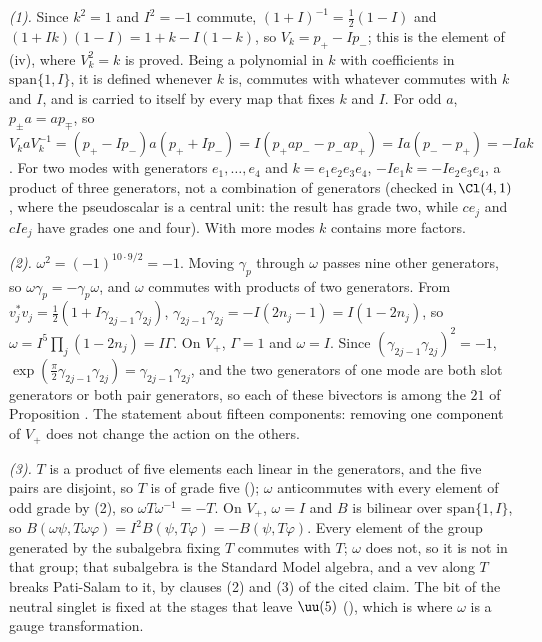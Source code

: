 \emph{(1).} Since $k^{2} = 1$ and $I^{2} = -1$ commute, $(1 + I)^{-1} = \tfrac12(1 - I)$ and $(1 + Ik)(1 - I) = 1 + k - I(1 - k)$, so $V_{k} = p_{+} - Ip_{-}$; this is the element of (iv), where $V_{k}^{2} = k$ is proved. Being a polynomial in $k$ with coefficients in $\mathrm{span}\{1, I\}$, it is defined whenever $k$ is, commutes with whatever commutes with $k$ and $I$, and is carried to itself by every map that fixes $k$ and $I$. For odd $a$, $p_{\pm}a = ap_{\mp}$, so $V_{k}aV_{k}^{-1} = (p_{+} - Ip_{-})a(p_{+} + Ip_{-}) = I(p_{+}ap_{-} - p_{-}ap_{+}) = Ia(p_{-} - p_{+}) = -Iak$. For two modes with generators $e_{1}, \dots, e_{4}$ and $k = e_{1}e_{2}e_{3}e_{4}$, $-Ie_{1}k = -Ie_{2}e_{3}e_{4}$, a product of three generators, not a combination of generators (checked in $\Cl(4,1)$, where the pseudoscalar is a central unit: the result has grade two, while $ce_{j}$ and $cIe_{j}$ have grades one and four). With more modes $k$ contains more factors.

\emph{(2).} $\omega^{2} = (-1)^{10\cdot 9/2} = -1$. Moving $\gamma_{p}$ through $\omega$ passes nine other generators, so $\omega\gamma_{p} = -\gamma_{p}\omega$, and $\omega$ commutes with products of two generators. From $v_{j}^{*}v_{j} = \tfrac12(1 + I\gamma_{2j-1}\gamma_{2j})$, $\gamma_{2j-1}\gamma_{2j} = -I(2n_{j} - 1) = I(1 - 2n_{j})$, so $\omega = I^{5}\prod_{j}(1 - 2n_{j}) = I\Gamma$. On $V_{+}$, $\Gamma = 1$ and $\omega = I$. Since $(\gamma_{2j-1}\gamma_{2j})^{2} = -1$, $\exp(\tfrac{\pi}{2}\gamma_{2j-1}\gamma_{2j}) = \gamma_{2j-1}\gamma_{2j}$, and the two generators of one mode are both slot generators or both pair generators, so each of these bivectors is among the $21$ of Proposition . The statement about fifteen components: removing one component of $V_{+}$ does not change the action on the others.

\emph{(3).} $T$ is a product of five elements each linear in the generators, and the five pairs are disjoint, so $T$ is of grade five (); $\omega$ anticommutes with every element of odd grade by (2), so $\omega T\omega^{-1} = -T$. On $V_{+}$, $\omega = I$ and $B$ is bilinear over $\mathrm{span}\{1, I\}$, so $B(\omega\psi, T\omega\varphi) = I^{2}B(\psi, T\varphi) = -B(\psi, T\varphi)$. Every element of the group generated by the subalgebra fixing $T$ commutes with $T$; $\omega$ does not, so it is not in that group; that subalgebra is the Standard Model algebra, and a vev along $T$ breaks Pati-Salam to it, by clauses (2) and (3) of the cited claim. The bit of the neutral singlet is fixed at the stages that leave $\uu(5)$ (), which is where $\omega$ is a gauge transformation.

